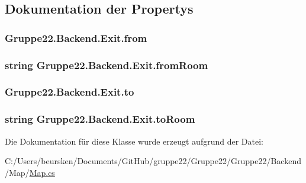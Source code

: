 \subsection{Dokumentation der Propertys}
\hypertarget{class_gruppe22_1_1_backend_1_1_exit_a1c66d12ccc76e3670276e5b6dff84432}{
\subsubsection[{from}]{ Gruppe22.\-Backend.\-Exit.\-from\hspace{0.3cm}{\ttfamily [get]}}}\label{class_gruppe22_1_1_backend_1_1_exit_a1c66d12ccc76e3670276e5b6dff84432}
\hypertarget{class_gruppe22_1_1_backend_1_1_exit_a40c48584f9dcff97a7894b7f806fe602}{
\subsubsection[{from\-Room}]{\setlength{\rightskip}{0pt plus 5cm}string Gruppe22.\-Backend.\-Exit.\-from\-Room\hspace{0.3cm}{\ttfamily [get]}}}\label{class_gruppe22_1_1_backend_1_1_exit_a40c48584f9dcff97a7894b7f806fe602}
\hypertarget{class_gruppe22_1_1_backend_1_1_exit_a4286116558464099383cae2dfaf75bf4}{
\subsubsection[{to}]{ Gruppe22.\-Backend.\-Exit.\-to\hspace{0.3cm}{\ttfamily [get]}}}\label{class_gruppe22_1_1_backend_1_1_exit_a4286116558464099383cae2dfaf75bf4}
\hypertarget{class_gruppe22_1_1_backend_1_1_exit_abbd47d66f499b32fa3824d1fdf14390d}{
\subsubsection[{to\-Room}]{\setlength{\rightskip}{0pt plus 5cm}string Gruppe22.\-Backend.\-Exit.\-to\-Room\hspace{0.3cm}{\ttfamily [get]}}}\label{class_gruppe22_1_1_backend_1_1_exit_abbd47d66f499b32fa3824d1fdf14390d}


Die Dokumentation für diese Klasse wurde erzeugt aufgrund der Datei\-:\begin{DoxyCompactItemize}
\item 
C\-:/\-Users/beursken/\-Documents/\-Git\-Hub/gruppe22/\-Gruppe22/\-Gruppe22/\-Backend/\-Map/\hyperlink{_map_8cs}{Map.\-cs}\end{DoxyCompactItemize}
